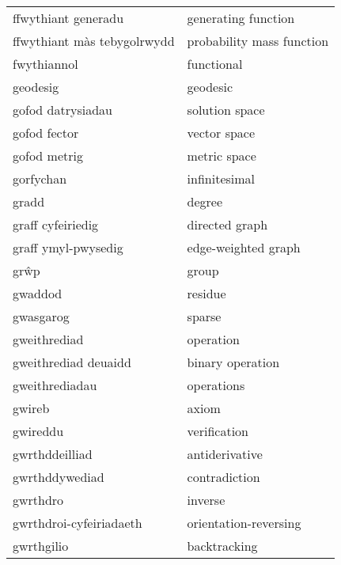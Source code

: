 \begin{supertabular}{p{0.22\textwidth}p{0.22\textwidth}}
             ffwythiant generadu &               generating function \\
     ffwythiant màs tebygolrwydd &         probability mass function \\
                     fwythiannol &                        functional \\
                        geodesig &                          geodesic \\
               gofod datrysiadau &                    solution space \\
                    gofod fector &                      vector space \\
                    gofod metrig &                      metric space \\
                       gorfychan &                     infinitesimal \\
                           gradd &                            degree \\
               graff cyfeiriedig &                    directed graph \\
             graff ymyl-pwysedig &               edge-weighted graph \\
                            grŵp &                             group \\
                         gwaddod &                           residue \\
                       gwasgarog &                            sparse \\
                    gweithrediad &                         operation \\
            gweithrediad deuaidd &                  binary operation \\
                  gweithrediadau &                        operations \\
                          gwireb &                             axiom \\
                        gwireddu &                      verification \\
                  gwrthddeilliad &                    antiderivative \\
                  gwrthddywediad &                     contradiction \\
                        gwrthdro &                           inverse \\
         gwrthdroi-cyfeiriadaeth &             orientation-reversing \\
                      gwrthgilio &                      backtracking \\

\end{supertabular}
